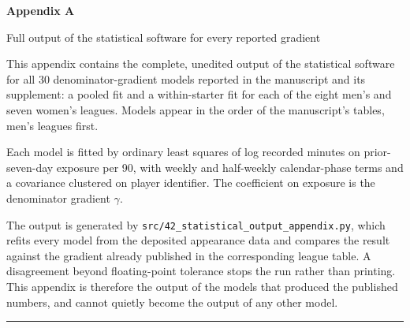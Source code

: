 \documentclass[10pt]{article}
\begin{document}
\begin{center}
{\Large\bfseries Appendix A\par}
\vspace{0.4em}
{\large Full output of the statistical software for every reported gradient\par}
\end{center}

\vspace{1em}

This appendix contains the complete, unedited output of the statistical
software for all 30 denominator-gradient models reported in the manuscript and
its supplement: a pooled fit and a within-starter fit for each of the eight
men's and seven women's leagues. Models appear in the order of the manuscript's
tables, men's leagues first.

Each model is fitted by ordinary least squares of log recorded minutes on
prior-seven-day exposure per 90, with weekly and half-weekly calendar-phase
terms and a covariance clustered on player identifier. The coefficient on
exposure is the denominator gradient $\gamma$.

The output is generated by \texttt{src/42\_statistical\_output\_appendix.py},
which refits every model from the deposited appearance data and compares the
result against the gradient already published in the corresponding league
table. A disagreement beyond floating-point tolerance stops the run rather than
printing. This appendix is therefore the output of the models that produced the
published numbers, and cannot quietly become the output of any other model.

\vspace{1em}
\hrule
\vspace{1em}

{\scriptsize

}
\end{document}
